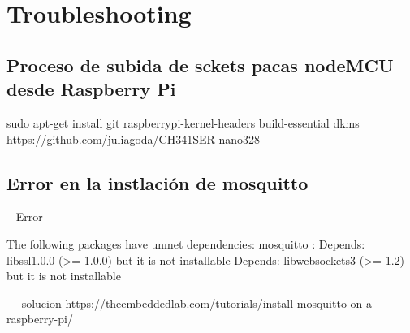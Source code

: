 
\cleardoublepage

\chapter{Troubleshooting}
\label{AppendiB:Key1}

\section{Proceso de subida de sckets pacas nodeMCU desde Raspberry Pi}
\label{AppendiB:Key2}

sudo apt-get install git raspberrypi-kernel-headers build-essential dkms
https://github.com/juliagoda/CH341SER
nano328


\section{Error en la instlación de mosquitto}
\label{AppendiB:Key3}
-- Error

The following packages have unmet dependencies:
 mosquitto : Depends: libssl1.0.0 (>= 1.0.0) but it is not installable
             Depends: libwebsockets3 (>= 1.2) but it is not installable

--- solucion
https://theembeddedlab.com/tutorials/install-mosquitto-on-a-raspberry-pi/


